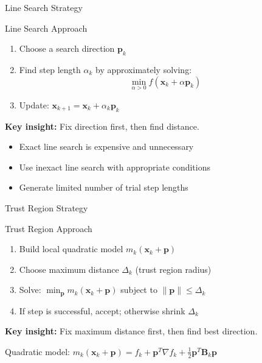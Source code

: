 \documentclass[aspectratio=1610]{beamer}
\begin{document}
\begin{frame}{Line Search Strategy}
  \begin{block}{Line Search Approach}
    \begin{enumerate}
      \item Choose a search direction $\mathbf{p}_k$
      \item Find step length $\alpha_k$ by approximately solving:
      $$\min_{\alpha > 0} f(\mathbf{x}_k + \alpha \mathbf{p}_k)$$
      \item Update: $\mathbf{x}_{k+1} = \mathbf{x}_k + \alpha_k \mathbf{p}_k$
    \end{enumerate}
  \end{block}
  
  \vspace{0.3cm}
  
  \textbf{Key insight:} Fix direction first, then find distance.
  
  \vspace{0.3cm}
  
  \begin{itemize}
    \item Exact line search is expensive and unnecessary
    \item Use inexact line search with appropriate conditions
    \item Generate limited number of trial step lengths
  \end{itemize}
\end{frame}

\begin{frame}{Trust Region Strategy}
  \begin{block}{Trust Region Approach}
    \begin{enumerate}
      \item Build local quadratic model $m_k(\mathbf{x}_k + \mathbf{p})$
      \item Choose maximum distance $\Delta_k$ (trust region radius)
      \item Solve: $\min_{\mathbf{p}} m_k(\mathbf{x}_k + \mathbf{p})$ subject to $\|\mathbf{p}\| \leq \Delta_k$
      \item If step is successful, accept; otherwise shrink $\Delta_k$
    \end{enumerate}
  \end{block}
  
  \vspace{0.3cm}
  
  \textbf{Key insight:} Fix maximum distance first, then find best direction.
  
  \vspace{0.3cm}
  
  Quadratic model: $m_k(\mathbf{x}_k + \mathbf{p}) = f_k + \mathbf{p}^T \nabla f_k + \frac{1}{2}\mathbf{p}^T \mathbf{B}_k \mathbf{p}$
\end{frame}
\end{document}
